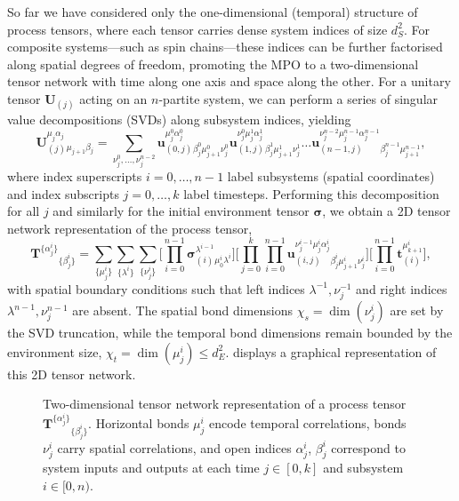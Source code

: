 So far we have considered only the one-dimensional (temporal) structure of process tensors, where each tensor carries dense system indices of size \(d^2_S\). For composite systems---such as spin chains---these indices can be further factorised along spatial degrees of freedom, promoting the MPO to a two-dimensional tensor network with time along one axis and space along the other. For a unitary tensor \(\mathbf{U}_{(j)}\) acting on an \(n\)-partite system, we can perform a series of singular value decompositions (SVDs) along subsystem indices, yielding
\begin{equation*}
    \mathbf{U}_{(j)}^{\mu_j\alpha_j}{}_{\mu_{j+1}\beta_j} 
    = \sum_{\nu_j^0,\dots,\nu_j^{n-2}}
    \mathbf{u}_{(0,j)}^{\mu_j^0\alpha_j^0}{}_{\beta_j^0\mu_{j+1}^0\nu_j^0}
    \mathbf{u}_{(1,j)}^{\nu_j^0\mu_j^1\alpha_j^1}{}_{\beta_j^1\mu_{j+1}^1\nu_j^1}\dots 
    \mathbf{u}_{(n-1,j)}^{\nu_j^{n-2}\mu_j^{n-1}\alpha_j^{n-1}}{}_{\beta_j^{n-1}\mu_{j+1}^{n-1}},
\end{equation*}
where index superscripts \(i=0,\dots,n-1\) label subsystems (spatial coordinates) and index subscripts \(j=0,\dots,k\) label timesteps. Performing this decomposition for all \(j\) and similarly for the initial environment tensor \(\pmb{\sigma}\), we obtain a 2D tensor network representation of the process tensor,
\begin{equation*}
    \mathbf{T}^{\{\alpha_j^i\}}{}_{\{\beta_j^i\}} = 
    \sum_{\{\mu_j^i\}} \sum_{\{\lambda^i\}} \sum_{\{\nu_j^i\}}
    \Biggl[\prod_{i=0}^{n-1}\pmb{\sigma}_{(i)}^{\lambda^{i-1}}{}_{\mu_0^i\lambda^i}\Biggr]
    \Biggl[\prod_{j=0}^{k}\prod_{i=0}^{n-1}\mathbf{u}_{(i, j)}^{\nu^{i-1}_j\mu_j^i\alpha_j^i}{}_{\beta_j^i\mu_{j+1}^i\nu_j^i}\Biggr]
    \Biggl[\prod_{i=0}^{n-1}\mathbf{t}_{(i)}^{\mu_{k+1}^i}\Biggr],
\end{equation*}
with spatial boundary conditions such that left indices \(\lambda^{-1}, \nu^{-1}_j\) and right indices \(\lambda^{n-1}, \nu^{n-1}_j\) are absent. The spatial bond dimensions \(\chi_s = \dim(\nu_j^i)\) are set by the SVD truncation, while the temporal bond dimensions remain bounded by the environment size, \(\chi_t = \dim(\mu_j^i) \le d_E^2\).  displays a graphical representation of this 2D tensor network.
\begin{figure}
    \centering
    
    \caption{Two-dimensional tensor network representation of a process tensor \(\mathbf{T}^{\{\alpha_j^i\}}{}_{\{\beta_j^i\}}\). Horizontal bonds \(\mu_j^i\) encode temporal correlations, bonds \(\nu_j^i\) carry spatial correlations, and open indices \(\alpha_j^i\), \(\beta_j^i\) correspond to system inputs and outputs at each time \(j \in [0,k]\) and subsystem \(i \in [0,n)\).}
    \label{fig:tensor-network-2d}
\end{figure}